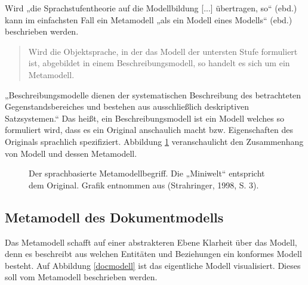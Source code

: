 
Wird „die Sprachstufentheorie auf die Modellbildung [...] übertragen, so“ (ebd.) kann im einfachsten Fall ein Metamodell „als ein Modell eines Modells“ (ebd.) beschrieben werden.

 
\begin{quote}
 Wird die Objektsprache, in der das Modell der untersten Stufe formuliert ist, abgebildet in einem Beschreibungsmodell, so handelt es sich um ein Metamodell. \citep[S.~3]{Strahringer}
\end{quote}
 
„Beschreibungsmodelle dienen der systematischen Beschreibung des betrachteten Gegenstandsbereiches und bestehen aus ausschließlich deskriptiven Satzsystemen.“ Das heißt, ein Beschreibungsmodell ist ein Modell welches so formuliert wird, dass es ein Original anschaulich macht bzw. Eigenschaften des Originals sprachlich spezifiziert. Abbildung \ref{metamodellbegriff} veranschaulicht den Zusammenhang von Modell und dessen Metamodell.

 
\begin{figure}[h!]
\centering
\advance\leftskip-2.5cm
\caption[Der sprachbasierte Metamodellbegriff]{ Der sprachbasierte Metamodellbegriff. Die „Miniwelt“ entspricht dem Original. Grafik entnommen aus (Strahringer, 1998, S. 3). }\label{metamodellbegriff}
\end{figure}
 
\subsection{Metamodell des Dokumentmodells}\label{metamodell_dokument}
 
Das Metamodell schafft auf einer abstrakteren Ebene Klarheit über das Modell, denn es beschreibt aus welchen Entitäten und Beziehungen ein konformes Modell besteht. Auf Abbildung \ref{docmodell} ist das eigentliche Modell visualisiert. Dieses soll vom Metamodell beschrieben werden.

